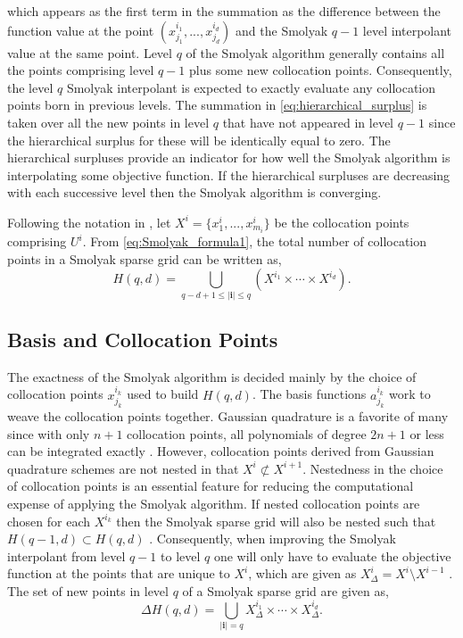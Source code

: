 which appears as the first term in the summation as the difference between the function value at the point $(x_{j_1}^{i_1},...,x_{j_d}^{i_d})$ and the Smolyak $q-1$ level interpolant value at the same point. Level $q$ of the Smolyak algorithm generally contains all the points comprising level $q-1$ plus some new collocation points. Consequently, the level $q$ Smolyak interpolant is expected to exactly evaluate any collocation points born in previous levels. The summation in \ref{eq:hierarchical_surplus} is taken over all the new points in level $q$ that have not appeared in level $q-1$ since the hierarchical surplus for these will be identically equal to zero. The hierarchical surpluses provide an indicator for how well the Smolyak algorithm is interpolating some objective function. If the hierarchical surpluses are decreasing with each successive level then the Smolyak algorithm is converging.

Following the notation in \cite{NovakRitter}, let $X^i=\lbrace x_1^i,...,x_{m_i}^i\rbrace$ be the collocation points comprising $U^i$. From \ref{eq:Smolyak_formula1}, the total number of collocation points in a Smolyak sparse grid can be written as,
\begin{equation} \label{eq:numer_points_in_smolyak}
    H(q,d) = \bigcup_{q-d+1\leq\vert\textbf{i}\vert\leq q}
     \left(X^{i_1}\times\cdots\times X^{i_d}\right).
\end{equation}     

\subsection{Basis and Collocation Points} \label{subsec:basis_and_points}

The exactness of the Smolyak algorithm is decided mainly by the choice of collocation points $x_{j_k}^{i_k}$ used to build $H(q,d)$. The basis functions $a_{j_k}^{i_k}$ work to weave the collocation points together. Gaussian quadrature is a favorite of many since with only $n+1$ collocation points, all polynomials of degree $2n+1$ or less can be integrated exactly \cite{NumAnyHenrici}. However, collocation points derived from Gaussian quadrature schemes are not nested in that $X^i \not\subset X^{i+1}$. Nestedness in the choice of collocation points is an essential feature for reducing the computational expense of applying the Smolyak algorithm. If nested collocation points are chosen for each $X^{i_k}$ then the Smolyak sparse grid will also be nested such that $H(q-1,d)\subset H(q,d)$ \cite{NovakRitter}. Consequently, when improving the Smolyak interpolant from level $q-1$ to level $q$ one will only have to evaluate the objective function at the points that are unique to $X^i$, which are given as $X_{\Delta}^{i} = X^i \setminus X^{i-1}$ \cite{AHSGC}.  The set of new points in level $q$ of a Smolyak sparse grid are given as,
\begin{equation} \label{eq:unique_points_ssg}
    \Delta H(q,d) = \bigcup_{\vert\textbf{i}\vert = q}
     X_{\Delta}^{i_1} \times\cdots\times X_{\Delta}^{i_d}.
\end{equation}   

